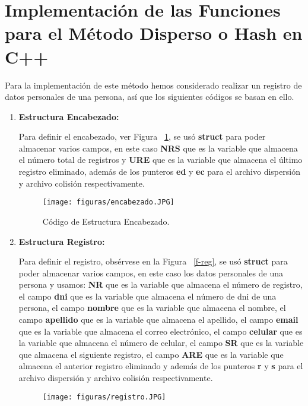 \documentclass[10pt,conference]{IEEEtran}
\begin{document}
\section{\textbf{Implementación de las Funciones para el Método Disperso o Hash en C++}} 
Para la implementación de este método hemos considerado realizar un registro de datos personales de una persona, así que los siguientes códigos se basan en ello. 
\begin{enumerate}[]
    \item {\textbf{Estructura Encabezado:}}
        \par Para definir el encabezado, ver Figura ~\ref{f-enca}, se usó \textbf{struct} para poder almacenar varios campos, en este caso \textbf{NRS} que es la variable que almacena el número total de registros y \textbf{URE} que es la variable que almacena el último registro eliminado, además de los punteros \textbf{ed} y \textbf{ec} para el archivo dispersión y archivo colisión respectivamente.
        \begin{figure}[H]
            \begin{center}
            \texttt{[image: figuras/encabezado.JPG]}
            \caption{Código de Estructura Encabezado.}
            \label{f-enca} 
            \end{center}
        \end{figure}
    \item {\textbf{Estructura Registro:}}
        \par Para definir el registro, obsérvese en la Figura ~\ref{f-reg}, se usó \textbf{struct} para poder almacenar varios campos, en este caso los datos personales de una persona y usamos: \textbf{NR} que es la variable que almacena el número de registro, el campo \textbf{dni} que es la variable que almacena el número de dni de una persona, el campo \textbf{nombre} que es la variable que almacena el nombre, el campo \textbf{apellido} que es la variable que almacena el apellido, el campo \textbf{email} que es la variable que almacena el correo electrónico, el campo \textbf{celular} que es la variable que almacena el número de celular, el campo \textbf{SR} que es la variable que almacena el siguiente registro, el campo \textbf{ARE} que es la variable que almacena el anterior registro eliminado y además de los punteros \textbf{r} y \textbf{s} para el archivo dispersión y archivo colisión respectivamente.
         \begin{figure}[H]
            \begin{center}
            \texttt{[image: figuras/registro.JPG]}

\end{center}
\end{figure}
\end{enumerate}
\end{document}
